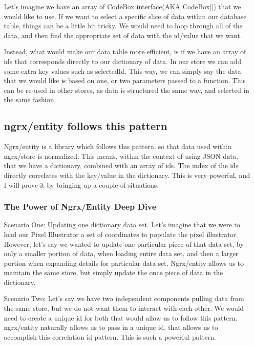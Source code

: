 Let's imagine we have an array of CodeBox interface(AKA CodeBox[]) that we would
like to use. If we want to select a specific slice of data within our database
table, things can be a little bit tricky. We would need to loop through all of
the data, and then find the appropriate set of data with the id/value that we
want.

Instead, what would make our data table more efficient, is if we have an array
of ids that corresponds directly to our dictionary of data. In our store we can
add some extra key values such as selectedId. This way, we can simply say the
data that we would like is based on one, or two parameters passed to a function.
This can be re-used in other stores, as data is structured the same way, and
selected in the same fashion.

\subsection{ngrx/entity follows this pattern}
Ngrx/entity is a library which follows this pattern, so that data used within
ngrx/store is normalized. This means, within the context of using JSON data,
that we have a dictionary, combined with an array of ids. The index of the ids
directly correlates with the key/value in the dictionary. This is very powerful,
and I will prove it by bringing up a couple of situations.

\subsubsection{The Power of Ngrx/Entity Deep Dive}
Scenario One:
Updating one dictionary data set. Let's imagine that we were to load our
Pixel Illustrator a set of coordinates to populate the pixel illustrator. However,
let's say we wanted to update one particular piece of that data set, by only
a smaller portion of data, when loading entire data set, and then a larger portion
when expanding details for particular data set. Ngrx/entity allows us to maintain
the same store, but simply update the once piece of data in the dictionary.

Scenario Two: 
Let's say we have two independent components pulling data from the same store,
but we do not want them to interact with each other. We would need to create a
unique id for both that would allow us to follow this pattern. ngrx/entity
naturally allows us to pass in a unique id, that allows us to accomplish this
correlation id pattern. This is such a powerful pattern.


